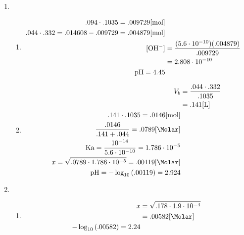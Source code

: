 \documentclass[12pt]{article}
\begin{document}
\begin{enumerate}
\begin{enumerate}
    \end{enumerate}

  \item

    \begin{enumerate}

      \item 

    \begin{equation}
      \begin{split}
        .094\cdot.1035=.009729[\si{\mole}]\\
        .044\cdot.332=.014608-.009729=.004879[\si{\mole}]\\
        [\ce{OH-}]&=\frac{(5.6\cdot10^{-10})(.004879)}{.009729}\\
        &= 2.808\cdot10^{-10}\\
        \ce{pH}=4.45
      \end{split}
      \label{11}
    \end{equation}

      \item 

    \begin{equation}
      \begin{split}
        V_b&= \frac{.044\cdot.332}{.1035}\\
        &= .141[\si{\liter}]\\
        .141\cdot.1035=.0146[\si{\mole}]\\
        \frac{.0146}{.141+.044}=.0789[\si{\Molar}]\\
        \ce{Ka}=\frac{10^{-14}}{5.6\cdot10^{-10}}=1.786\cdot10^{-5}\\
        x=\sqrt{.0789\cdot1.786\cdot10^{-5}}=.00119[\si{\Molar}]\\
        \ce{pH}=-\log_{10}\left( .00119 \right)=2.924
      \end{split}
      \label{12}
    \end{equation}

    \end{enumerate}

  \item

    \begin{enumerate}

      \item 

    \begin{equation}
      \begin{split}
        x&=\sqrt{.178\cdot1.9\cdot10^{-4}}\\
        &= .00582[\si{\Molar}]\\
        -\log_{10}\left( .00582 \right)=2.24\\
      \end{split}
      \label{13}
    \end{equation}


\end{enumerate}
\end{enumerate}
\end{document}
